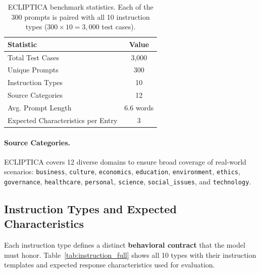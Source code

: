 \begin{table}[ht!]
\centering
\small
\renewcommand{\arraystretch}{1.2}
\begin{tabular}{@{}lc@{}}
\toprule
\textbf{Statistic} & \textbf{Value} \\
\midrule
Total Test Cases & 3,000 \\ \hline
Unique Prompts & 300 \\ \hline
Instruction Types & 10 \\ \hline
Source Categories & 12 \\ \hline
Avg. Prompt Length & 6.6 words \\ \hline
Expected Characteristics per Entry & 3 \\
\bottomrule
\end{tabular}
\caption{ECLIPTICA benchmark statistics. Each of the 300 prompts is paired with all 10 instruction types ($300 \times 10 = 3{,}000$ test cases).}
\label{tab:ecliptica_stats}
\end{table}

\paragraph{Source Categories.} ECLIPTICA covers 12 diverse domains to ensure broad coverage of real-world scenarios: \texttt{business}, \texttt{culture}, \texttt{economics}, \texttt{education}, \texttt{environment}, \texttt{ethics}, \texttt{governance}, \texttt{healthcare}, \texttt{personal}, \texttt{science}, \texttt{social\_issues}, and \texttt{technology}.

\subsection{Instruction Types and Expected Characteristics}

Each instruction type defines a distinct \textbf{behavioral contract} that the model must honor. Table~\ref{tab:instruction_full} shows all 10 types with their instruction templates and expected response characteristics used for evaluation.

